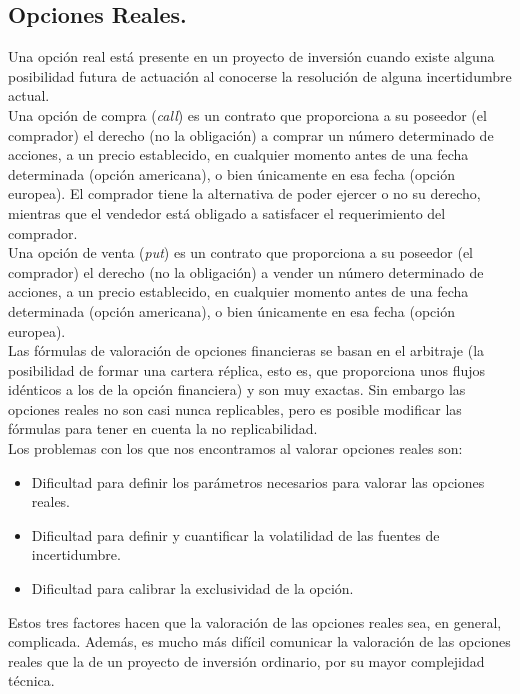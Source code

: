 \subsection{Opciones Reales.}

Una opción real está presente en un proyecto de inversión cuando existe alguna posibilidad futura de actuación al conocerse la resolución de alguna incertidumbre actual.\\

Una opción de compra (\textit{call}) es un contrato que proporciona a su poseedor (el comprador) el derecho (no la obligación) a comprar un número determinado de acciones, a un precio establecido, en cualquier momento antes de una fecha determinada (opción americana), o bien únicamente en esa fecha (opción europea). El comprador tiene la alternativa de poder ejercer o no su derecho, mientras que el vendedor está obligado a satisfacer el requerimiento del comprador.\\


Una opción de venta (\textit{put}) es un contrato que proporciona a su poseedor (el comprador) el derecho (no la obligación) a vender un número determinado de acciones, a un precio establecido, en cualquier momento antes de una fecha determinada (opción americana), o bien únicamente en esa fecha (opción europea).\\

Las fórmulas de valoración de opciones financieras se basan en el arbitraje (la posibilidad de formar una cartera réplica, esto es, que proporciona unos flujos idénticos a los de la opción financiera) y son muy exactas. Sin embargo las opciones reales no son casi nunca replicables, pero es posible modificar las fórmulas para tener en cuenta la no replicabilidad.\\

Los problemas con los que nos encontramos al valorar opciones reales son:\\

\begin{itemize}
\item Dificultad para definir los parámetros necesarios para valorar las opciones reales.
\item Dificultad para definir y cuantificar la volatilidad de las fuentes de incertidumbre.
\item Dificultad para calibrar la exclusividad de la opción.
\end{itemize}

Estos tres factores hacen que la valoración de las opciones reales sea, en general, complicada. Además, es mucho más difícil comunicar la valoración de las opciones reales que la de un proyecto de inversión ordinario, por su mayor complejidad técnica.\\


